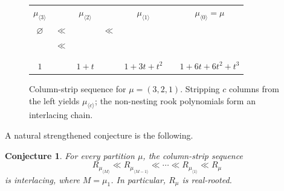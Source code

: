 \documentclass[11pt,reqno]{amsart}
\newtheorem{conjecture}[theorem]{Conjecture}
\theoremstyle{definition}
\newcommand{\interl}{\ll}
\begin{document}
\begin{figure}[ht]
\centering
{}
\begin{tabular}{c@{\quad}c@{\quad}c@{\quad}c@{\quad}c@{\quad}c@{\quad}c}
$\mu_{\langle 3 \rangle}$ && $\mu_{\langle 2 \rangle}$ &&
$\mu_{\langle 1 \rangle}$ && $\mu_{\langle 0 \rangle} = \mu$
\\[4pt]
$\varnothing$
& $\interl$ &
\begin{ytableau}
{}
\end{ytableau}
& $\interl$ &
\begin{ytableau}
{} & {} \\
{}
\end{ytableau}
& $\interl$ &
\begin{ytableau}
{} & {} & {} \\
{} & {} \\
{}
\end{ytableau}
\\[6pt]
$1$ && $1{+}t$ && $1{+}3t{+}t^2$ && $1{+}6t{+}6t^2{+}t^3$
\end{tabular}

\medskip
\caption{Column-strip sequence for $\mu = (3,2,1)$.
Stripping $c$ columns from the left yields $\mu_{\langle c \rangle}$;
the non-nesting rook polynomials form an interlacing chain.}
\label{fig:column_strip}
\end{figure}

A natural strengthened conjecture is the following.

\begin{conjecture}\label{conj:main_strong}
For every partition $\mu$, the column-strip sequence
\[
  R_{\mu_{\langle M \rangle}} \interl
  R_{\mu_{\langle M-1 \rangle}} \interl
  \dotsb \interl
  R_{\mu_{\langle 1 \rangle}} \interl R_\mu
\]
is interlacing, where $M = \mu_1$.
In particular, $R_\mu$ is real-rooted.
\end{conjecture}
\end{document}
